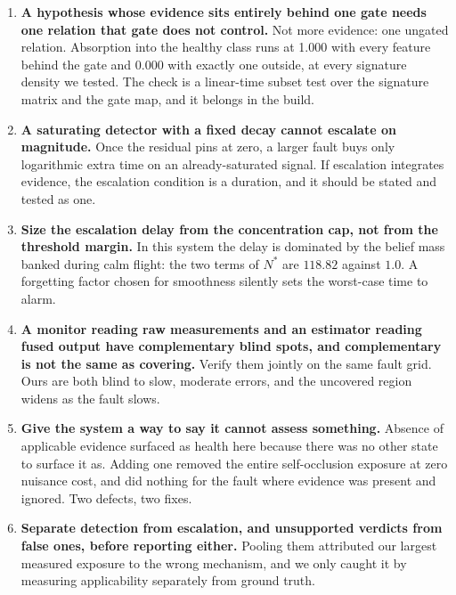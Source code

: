 \documentclass[11pt,a4paper]{article}
\begin{document}
\begin{enumerate}
\item \textbf{A hypothesis whose evidence sits entirely behind one gate needs
one relation that gate does not control.} Not more evidence: one ungated
relation. Absorption into the healthy class runs at 1.000 with every feature
behind the gate and 0.000 with exactly one outside, at every signature density
we tested. The check is a linear-time subset test over the signature matrix and
the gate map, and it belongs in the build.
\item \textbf{A saturating detector with a fixed decay cannot escalate on
magnitude.} Once the residual pins at zero, a larger fault buys only
logarithmic extra time on an already-saturated signal. If escalation integrates
evidence, the escalation condition is a duration, and it should be stated and
tested as one.
\item \textbf{Size the escalation delay from the concentration cap, not from
the threshold margin.} In this system the delay is dominated by the belief mass
banked during calm flight: the two terms of $N^*$ are $118.82$ against $1.0$. A
forgetting factor chosen for smoothness silently sets the worst-case time to
alarm.
\item \textbf{A monitor reading raw measurements and an estimator reading
fused output have complementary blind spots, and complementary is not the same
as covering.} Verify them jointly on the same fault grid. Ours are both blind
to slow, moderate errors, and the uncovered region widens as the fault slows.
\item \textbf{Give the system a way to say it cannot assess something.} Absence
of applicable evidence surfaced as health here because there was no other state
to surface it as. Adding one removed the entire self-occlusion exposure at zero
nuisance cost, and did nothing for the fault where evidence was present and
ignored. Two defects, two fixes.
\item \textbf{Separate detection from escalation, and unsupported verdicts from
false ones, before reporting either.} Pooling them attributed our largest
measured exposure to the wrong mechanism, and we only caught it by measuring
applicability separately from ground truth.
\end{enumerate}



\end{document}
